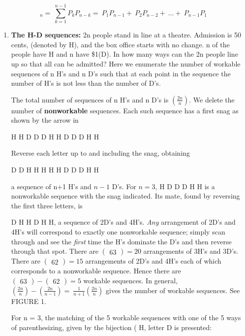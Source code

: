 \documentclass[10pt,letter]{article}
\begin{document}
\[
_{n} = \ \sum_{k = 1}^{n - 1}{P_{k}P_{n - k} = \ P_{1}P_{n - 1} + \ P_{2}P_{n - 2} + \ \ldots + \ P_{n - 1}P_{1}}
\]
\begin{enumerate}
\def\labelenumi{\Roman{enumi}.}

\item
  \textbf{The H-D sequences:} 2n people stand in line at a theatre.
  Admission is 50 cents, (denoted by H), and the box office starts with no
  change. n of the people have H and n have \$1(D). In how many ways can
  the 2n people line up so that all can be admitted? Here we enumerate
  the number of workable sequences of n H's and n D's such that at each
  point in the sequence the number of H's is not less than the number of
  D's.

The total number of sequences of n H's and n D's is
  \(\left( \frac{2n}{n} \right)\). We delete the number of
  \textbf{nonworkable} sequences. Each such sequence has a first snag as
  shown by the arrow in

H H D D D H H D D D H H

Reverse each letter up to and including the snag, obtaining

D D H H H H H D D D H H

a sequence of n+1 H's and \(n - 1\) D's. For \(n = 3\), H D D D H H is
  a nonworkable sequence with the snag indicated. Its mate, found by
  reversing the first three letters, is

D H H D H H, a sequence of 2D's and 4H's. \emph{Any} arrangement of
  2D's and 4H's will correspond to exactly one nonworkable sequence;
  simply scan through and see the \emph{first} time the H's dominate the
  D's and then reverse through that spot. There are
  \(\begin{pmatrix}
  6
  3
  \end{pmatrix}
 = 20\) arrangements of 3H's and 3D's. There are
  \(\begin{pmatrix}
  6
  2
  \end{pmatrix}
 = 15\) arrangements of 2D's and 4H's each of which
  corresponds to a nonworkable sequence. Hence there are
  \(\begin{pmatrix}
  6
  3
  \end{pmatrix}
 -\begin{pmatrix}
  6
  2
  \end{pmatrix}
 = 5\) workable sequences. In general,
  \(\left( \frac{2n}{n} \right) - \left( \frac{2n}{n - 1} \right) = \ \frac{1}{n + 1}\left( \frac{2n}{n} \right)\)
  gives the number of workable sequences. See FIGURE 1.

For n = 3, the matching of the 5 workable sequences with one of the 5
  ways of parenthesizing, given by the bijection ( H, letter  D is
  presented:

\end{enumerate}
\end{document}
